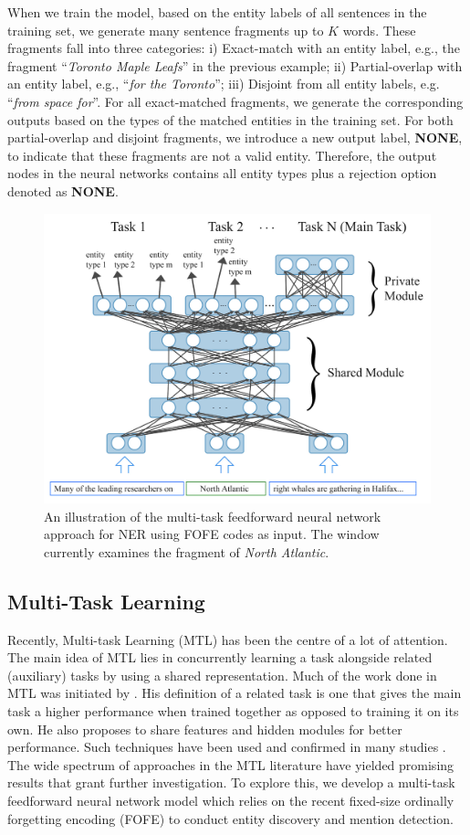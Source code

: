 \documentclass[11pt]{article}
\begin{document}
When we train the model, based on the entity labels of all sentences in the training set, we generate many sentence fragments up to $K$ words. These fragments fall into three categories: i) Exact-match with an entity label, e.g., the fragment  ``{\it Toronto Maple Leafs}'' in the previous example; ii) Partial-overlap with an entity label, e.g., ``{\it for the Toronto}''; iii) Disjoint from all entity labels, e.g. ``{\it from space for}''.
For all exact-matched fragments, we generate the corresponding outputs based on the types of the matched entities in the training set. For both partial-overlap and disjoint fragments, we introduce a new output label, {\bf NONE}, to indicate that these fragments are not a valid entity. Therefore, the output nodes in the neural networks contains all entity types plus a rejection option denoted as {\bf NONE}.

\begin{figure}[t]
\centering
\includegraphics[width=0.8\linewidth]{MTL-method.jpg}
\caption{An illustration of the multi-task feedforward neural network approach for NER using FOFE codes as input. The window currently examines the fragment of {\it North Atlantic}.}
\label{Fig:FOFE-MTL-NER-diagram}
\end{figure}

\subsection{Multi-Task Learning}

Recently, Multi-task Learning (MTL) has been the centre of a lot of attention. The main idea of MTL lies in concurrently learning a task alongside related (auxiliary) tasks by using a shared representation. Much of the work done in MTL was initiated by \cite{Caruana:1997:ML:262868.262872}. 
His definition of a related task is one that gives the main task a higher performance when trained together as opposed to training it on its own. He also proposes to share features and hidden modules for better performance. Such techniques have been used and confirmed in many studies \cite{Maurer:2016:BMR:2946645.3007034,Ando:2005:FLP:1046920.1194905}. The wide spectrum of approaches in the MTL literature have yielded promising results that grant further investigation. To explore this, we develop a multi-task feedforward neural network model which relies on the recent fixed-size ordinally forgetting encoding (FOFE) to conduct entity discovery and mention detection. 
\end{document}
